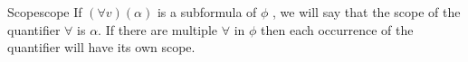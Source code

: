 \begin{definition}{Scope}{scope}
If $(\forall v)(\alpha)$ is a subformula of $ \phi  $ , we will say that the scope of the quantifier $\forall$ is $\alpha$.  If there are multiple $ \forall  $ in $ \phi  $ then each occurrence of the quantifier will have its own scope. 
\end{definition}
